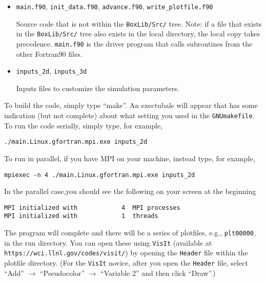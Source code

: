 \begin{itemize}
\item {\tt main.f90}, {\tt init\_data.f90}, {\tt advance.f90}, {\tt write\_plotfile.f90}

Source code that is not within the {\tt BoxLib/Src/} tree.  Note: if a file that exists in the
{\tt BoxLib/Src/} tree also exists in the local directory, the local copy takes precedence.
{\tt main.f90} is the driver program that calls subroutines from the other Fortran90 files.

\item {\tt inputs\_2d}, {\tt inputs\_3d}

Inputs files to customize the simulation parameters.

\end{itemize}

To build the code, simply type ``make''.  An exectubale will appear that has some indication (but not complete)
about what setting you used in the {\tt GNUmakefile}.  To run the code serially, simply type, for example,
\begin{lstlisting}[language={[gnu]make},mathescape=false]
./main.Linux.gfortran.mpi.exe inputs_2d
\end{lstlisting}
To run in parallel, if you have MPI on your machine, instead type, for example,
\begin{lstlisting}[language={[gnu]make},mathescape=false]
mpiexec -n 4 ./main.Linux.gfortran.mpi.exe inputs_2d
\end{lstlisting}
In the parallel case,you should see the following on your screen at the beginning
\begin{lstlisting}[language={[gnu]make},mathescape=false]
MPI initialized with            4  MPI processes
MPI initialized with            1  threads
\end{lstlisting}
The program will complete and there will be a series of plotfiles, e.g., {\tt plt00000}, in the run directory.
You can open these using {\tt VisIt} (available at {\tt https://wci.llnl.gov/codes/visit/}) by opening
the {\tt Header} file within the plotfile directory.  (For the {\tt VisIt} novice, after you open the {\tt Header}
file, select ``Add'' $\rightarrow$ ``Pseudocolor'' $\rightarrow$ ``Variable 2'' and then click ``Draw''.)
